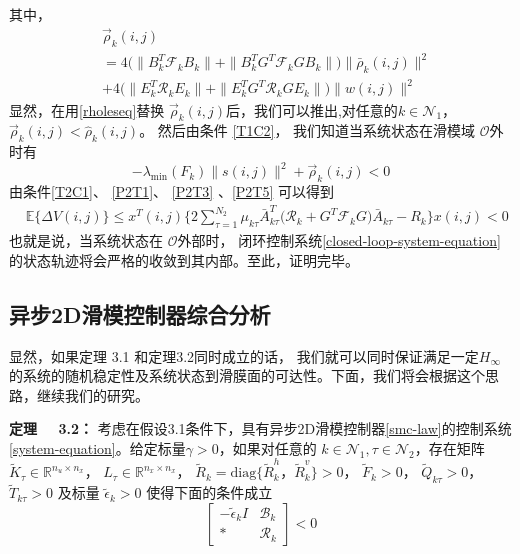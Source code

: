 	其中，
	\begin{equation*}
	\begin{split}
	&\vec{\rho}_{k}(i,j)\\
	&= 4\big(\|B^{T}_{k}\mathcal{F}_{k}B_{k}\|+ \|B^{T}_{k}G^{T}\mathcal{F}_{k}GB_{k}\|\big) \|\bar{\rho}_{k}(i,j)\|^{2} \\
	&+ 4\big(\|E^{T}_{k}\mathcal{R}_{k}E_{k}\|+ \|E^{T}_{k}G^{T}\mathcal{R}_{k}GE_{k}\|\big) \|w(i,j)\|^{2} 
	\end{split}
	\end{equation*}  
	显然，在用\eqref{rholeseq}替换 $\vec{\rho}_{k}(i,j)$后，我们可以推出,对任意的$k\in\mathcal{N}_{1}$， $\vec{\rho}_{k}(i,j) < \hat{\rho}_{k}(i,j)$。
	然后由条件 \eqref{T1C2}， 我们知道当系统状态在滑模域 $\mathcal{O}$外时有
	\begin{equation}\label{P2T5}
	-\lambda_{\mathrm{min}}(F_{k})\|s(i,j)\|^{2} + \vec{\rho}_{k}(i,j) <0
	\end{equation}
	由条件\eqref{T2C1}、 \eqref{P2T1}、 \eqref{P2T3} 、\eqref{P2T5} 可以得到
	\begin{equation}
	\begin{split}
	&\mathbb{E}\{\varDelta V(i,j) \} \leq x^{T}(i,j)\Big\{ 2\sum_{\tau =1}^{N_{2}}\mu_{k\tau }\bar{A}^{T}_{k\tau }\big(\mathcal{R}_{k} +G^{T}\mathcal{F}_{k}G \big)\bar{A}_{k\tau } -R_{k} \Big\} x(i,j)<0
	\end{split}
	\end{equation}
	也就是说，当系统状态在 $\mathcal{O}$外部时，  闭环控制系统\eqref{closed-loop-system-equation} 的状态轨迹将会严格的收敛到其内部。至此，证明完毕。
	
	
\subsection{异步2D滑模控制器综合分析 }\label{smc-law-synthesis} 
	显然，如果定理 3.1 和定理3.2同时成立的话， 我们就可以同时保证满足一定$H_{\infty}$的系统的随机稳定性及系统状态到滑膜面的可达性。下面，我们将会根据这个思路，继续我们的研究。
	
	{\bf 定理 \ \ 3.2：}
	考虑在假设3.1条件下，具有异步2D滑模控制器\eqref{smc-law}的控制系统 \eqref{system-equation}。给定标量$\gamma>0$，如果对任意的 $k\in\mathcal{N}_{1}, \tau\in\mathcal{N}_{2}$，存在矩阵 $\tilde{K}_{\tau }\in\mathbb{R}^{n_u\times n_x}$， $L_{\tau }\in\mathbb{R}^{n_x\times n_x}$， $\tilde{R}_{k}=\mathrm{diag}\{\tilde{R}^{h}_{k}，\tilde{R}^{v}_{k}\}>0$， $\tilde{F}_{k}>0$，  $\tilde{Q}_{k\tau }>0$， $\tilde{T}_{k\tau }>0$ 及标量 $\tilde{\epsilon}_{k}>0$ 使得下面的条件成立
	\begin{equation} \label{T3C1}
	\begin{bmatrix}
	-\tilde{\epsilon}_{k}I &\mathscr{B}_{k}\\
	*& \mathscr{R}_{k}
	\end{bmatrix} < 0
	\end{equation}
	
